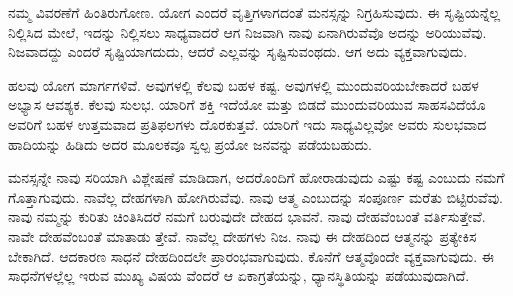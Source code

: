 ನಮ್ಮ ವಿವರಣೆಗೆ ಹಿಂತಿರುಗೋಣ. ಯೋಗ ಎಂದರೆ ವೃತ್ತಿಗಳಾಗದಂತೆ ಮನಸ್ಸನ್ನು ನಿಗ್ರಹಿಸುವುದು. ಈ ಸೃಷ್ಟಿಯನ್ನೆಲ್ಲ ನಿಲ್ಲಿಸಿದ ಮೇಲೆ, ಇದನ್ನು ನಿಲ್ಲಿಸಲು ಸಾಧ್ಯವಾದರೆ ಆಗ ನಿಜವಾಗಿ ನಾವು ಏನಾಗಿರುವೆವೊ ಅದನ್ನು ಅರಿಯುವೆವು. ನಿಜವಾದದ್ದು ಎಂದರೆ ಸೃಷ್ಟಿಯಾಗದುದು, ಆದರೆ ಎಲ್ಲವನ್ನು ಸೃಷ್ಟಿಸುವಂಥದು. ಆಗ ಅದು ವ್ಯಕ್ತವಾಗುವುದು.

ಹಲವು ಯೋಗ ಮಾರ್ಗಗಳಿವೆ. ಅವುಗಳಲ್ಲಿ ಕೆಲವು ಬಹಳ ಕಷ್ಟ. ಅವುಗಳಲ್ಲಿ ಮುಂದುವರಿಯಬೇಕಾದರೆ ಬಹಳ ಅಭ್ಯಾಸ ಆವಶ್ಯಕ. ಕೆಲವು ಸುಲಭ. ಯಾರಿಗೆ ಶಕ್ತಿ ಇದೆಯೋ ಮತ್ತು ಬಿಡದೆ ಮುಂದುವರಿಯುವ ಸಾಹಸವಿದೆಯೊ ಅವರಿಗೆ ಬಹಳ ಉತ್ತಮವಾದ ಪ್ರತಿಫಲಗಳು ದೊರಕುತ್ತವೆ. ಯಾರಿಗೆ ಇದು ಸಾಧ್ಯವಿಲ್ಲವೋ ಅವರು ಸುಲಭವಾದ ಹಾದಿಯನ್ನು ಹಿಡಿದು ಅದರ ಮೂಲಕವೂ ಸ್ವಲ್ಪ ಪ್ರಯೋ ಜನವನ್ನು ಪಡೆಯಬಹುದು.

ಮನಸ್ಸನ್ನೇ ನಾವು ಸರಿಯಾಗಿ ವಿಶ್ಲೇಷಣೆ ಮಾಡಿದಾಗ, ಅದರೊಂದಿಗೆ ಹೋರಾಡುವುದು ಎಷ್ಟು ಕಷ್ಟ ಎಂಬುದು ನಮಗೆ ಗೊತ್ತಾಗುವುದು. ನಾವೆಲ್ಲ ದೇಹಗಳಾಗಿ ಹೋಗಿರುವೆವು. ನಾವು ಆತ್ಮ ಎಂಬುದನ್ನು ಸಂಪೂರ್ಣ ಮರೆತು ಬಿಟ್ಟಿರುವೆವು. ನಾವು ನಮ್ಮನ್ನು ಕುರಿತು ಚಿಂತಿಸಿದರೆ ನಮಗೆ ಬರುವುದೇ ದೇಹದ ಭಾವನೆ. ನಾವು ದೇಹವೆಂಬಂತೆ ವರ್ತಿಸುತ್ತೇವೆ. ನಾವೇ ದೇಹವೆಂಬಂತೆ ಮಾತಾಡು ತ್ತೇವೆ. ನಾವೆಲ್ಲ ದೇಹಗಳು ನಿಜ. ನಾವು ಈ ದೇಹದಿಂದ ಆತ್ಮನನ್ನು ಪ್ರತ್ಯೇಕಿಸ ಬೇಕಾಗಿದೆ. ಆದಕಾರಣ ಸಾಧನೆ ದೇಹದಿಂದಲೇ ಪ್ರಾರಂಭವಾಗುವುದು. ಕೊನೆಗೆ ಆತ್ಮವೊಂದೇ ವ್ಯಕ್ತವಾಗುವುದು. ಈ ಸಾಧನೆಗಳಲ್ಲೆಲ್ಲ ಇರುವ ಮುಖ್ಯ ವಿಷಯ ವೆಂದರೆ ಆ ಏಕಾಗ್ರತೆಯನ್ನು, ಧ್ಯಾನಸ್ಥಿತಿಯನ್ನು ಪಡೆಯುವುದಾಗಿದೆ.

